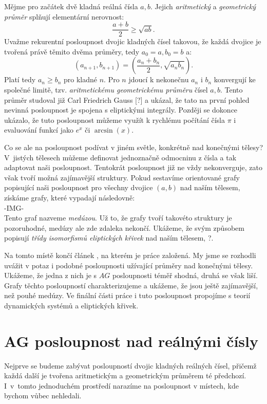\documentclass[12pt]{report}
\begin{document}
Mějme pro začátek dvě kladná reálná čísla $a,b$. Jejich \textit{aritmetický} a \textit{geometrický průměr} splňují elementární nerovnost:
$$\frac{a+b}{2} \geqslant \sqrt{ab}.$$
Uvažme rekurentní posloupnost dvojic kladných čísel takovou, že každá dvojice je tvořená právě těmito dvěma průměry, tedy $a_0 = a, b_0 = b$ a:
\begin{equation*}
(a_{n+1},b_{n+1}) = \left(\frac{a_n+b_n}{2}, \sqrt{a_n b_n} \right).
\end{equation*}
Platí tedy $a_n \geqslant b_n$ pro kladné $n$. Pro $n$ jdoucí k nekonečnu $a_n$ i $b_n$ konvergují ke společné limitě, tzv. \textit{aritmetickému geometrickému průměru} čísel $a,b$. Tento průměr studoval již Carl Friedrich Gauss [?] a ukázal, že tato na první pohled nevinná posloupnost je spojena s eliptickými integrály. Později se dokonce ukázalo, že tuto posloupnost můžeme využít k rychlému počítání čísla $\pi$ i evaluování funkcí jako $e^x$ či $\arcsin(x)$. 

Co se ale na posloupnost podívat v jiném světle, konkrétně nad konečnými tělesy? V~jistých tělesech můžeme definovat jednoznačně  odmocninu z čísla a tak adaptovat naši posloupnost. Tentokrát posloupnost již ne vždy nekonverguje, zato však tvoří možná zajímavější struktury. Pokud sestavíme orientované grafy popisující naši posloupnost pro všechny dvojice $(a,b)$ nad naším tělesem, získáme grafy, které vypadají následovně:\\
-IMG-\\
Tento graf nazveme \textit{medúzou}. Už to, že grafy tvoří takovéto struktury je pozoruhodné, medúzy ale zde zdaleka nekončí. Ukážeme, že svým způsobem popisují \textit{třídy isomorfismů eliptických křivek} nad naším tělesem, ?. 

Na tomto místě končí článek \cite{Meduza}, na kterém je práce založená. My jsme se rozhodli uvážit v potaz i podobné posloupnosti užívající průměry nad konečnými tělesy. Ukážeme, že jedna z nich je s $AG$ posloupnosti téměř shodná, druhá se však liší. Grafy těchto posloupností charakterizujeme a ukážeme, že jsou ještě zajímavější, než pouhé medúzy. Ve finální části práce i tuto posloupnost propojíme s teorií dynamických systémů a eliptických křivek.

\chapter{AG posloupnost nad reálnými čísly}


Nejprve se budeme zabývat posloupností dvojic kladných reálných čísel, přičemž každá další je tvořena aritmetickým a geometrickým průměrem té předchozí. I~v~tomto jednoduchém prostředí narazíme na posloupnost v místech, kde bychom vůbec nehledali.
\end{document}
